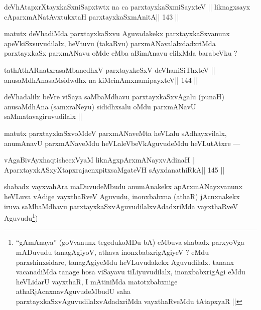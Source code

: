 \begin{shl}
\footnotemark[3]deVhAtapxrXtayxkaSxniSapxtwtx na ca parxtayxkaSxmiSayxteV ||
liknagxsayx cAparxmANatAvxtukxtaH  parxtayxkaSxmAnitA\hfill || 143 ||
\end{shl}

\begin{artha}
matutx deVhadiMda parxtayxkaSxvu Aguvadakekx parxtayxkaSxvanunx apeVkiSxsuvudilalx, heVtuvu (takaRvu) parxmANavalalxdadxriMda parxtayxkaSx parxmANavu oMde eMba aBimAnavu elilxMda barabeVku ?
\end{artha}

\begin{shl}
\footnotemark[4]tathA\s thARnatxrasaMbanedhxV parxtayxkeSxV deVhaniSiThxteV ||
anusaMdhAnasaMsidwdhx na kiMcinAmxnamipayxteV\hfill || 144 ||
\end{shl}

\begin{artha}
deVhadalilx beVre viSaya saMbaMdhavu parxtayxkaSxvAgalu (punaH) anusaMdhAna (samxraNeyu) sididhxsalu oMdu parxmANavU saMmatavagiruvudilalx || 

matutx parxtayxkaSxvoMdeV parxmANaveMta heVLalu sAdhayxvilalx, anumAnavU parxmANaveMdu heVLaleVbeVkAguvudeMdu heVLutAtxre ---
\end{artha}

\begin{shl}
vAgaBivAyxhaqtishecxVyaM liknAgxpArxmANayxvAdinaH ||
AparxtayxkASxyXtapxrajacnxpitxsaMgateVH sAyxdanathiRkA\hfill || 145 ||
\end{shl}

\begin{artha}
shabadx vayxvahAra maDuvudeMbudu anumAnakekx apArxmANayxvanunx heVLuva vAdige vayxthaRveV Aguvudu, inonxbabxna (athaR) jAcnxnakekx iruva saMbaMdhavu parxtayxkaSxvAguvudilalxvAdadxriMda vayxthaRveV Aguvudu\footnote[5]{``gAmAnaya'' (goVvanunx tegedukoMDu bA) eMbuva shabadx parxyoVga mADuvudu tanagAgiyoV, athava inonxbabxrigAgiyeV ? eMdu parxshinxsidare, tanagAgiyeMdu heVLuvudakekx Aguvudilalx. tananx vacanadiMda tanage hosa viSayavu tiLiyuvudilalx, inonxbabxrigAgi eMdu heVLidarU vayxthaR, I mAtiniMda matotxbabxnige athaRjAcnxnavAguvudeMbudU saha parxtayxkaSxvAguvudilalxvAdadxriMda vayxthaRveMdu tAtapxyaR ||})
\end{artha}

